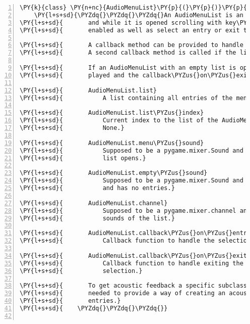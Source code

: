 \begin{Verbatim}[commandchars=\\\{\},numbers=left,firstnumber=1,stepnumber=1]
\PY{k}{class} \PY{n+nc}{AudioMenuList}\PY{p}{(}\PY{p}{)}\PY{p}{:}
    \PY{l+s+sd}{\PYZdq{}\PYZdq{}\PYZdq{}An AudioMenuList is an acoustic widget for a list menu. It can be opened}
\PY{l+s+sd}{       and while it is opened scrolling with key\PYZhy{}events through its entries is}
\PY{l+s+sd}{       enabled as well as select an entry or exit the menu by pressing a key.}

\PY{l+s+sd}{       A callback method can be provided to handle the selection of an entry.}
\PY{l+s+sd}{       A second callback method is called if the list is exited.}

\PY{l+s+sd}{       If an AudioMenuList with an empty list is opened its empty\PYZus{}sound is}
\PY{l+s+sd}{       played and the callback\PYZus{}on\PYZus{}exit method is called.}

\PY{l+s+sd}{       AudioMenuList.list}
\PY{l+s+sd}{           A list containing all entries of the menu.}

\PY{l+s+sd}{       AudioMenuList.list\PYZus{}index}
\PY{l+s+sd}{           Current index to the list of the AudioMenuList. Initially set to}
\PY{l+s+sd}{           None.}

\PY{l+s+sd}{       AudioMenuList.menu\PYZus{}sound}
\PY{l+s+sd}{           Supposed to be a pygame.mixer.Sound and is played as title when the}
\PY{l+s+sd}{           list opens.}

\PY{l+s+sd}{       AudioMenuList.empty\PYZus{}sound}
\PY{l+s+sd}{           Supposed to be a pygame.mixer.Sound and is played when the list opens}
\PY{l+s+sd}{           and has no entries.}

\PY{l+s+sd}{       AudioMenuList.channel}
\PY{l+s+sd}{           Supposed to be a pygame.mixer.channel and is used to play back all}
\PY{l+s+sd}{           sounds of the list.}

\PY{l+s+sd}{       AudioMenuList.callback\PYZus{}on\PYZus{}entry\PYZus{}selected}
\PY{l+s+sd}{           Callback function to handle the selection of an entry.}

\PY{l+s+sd}{       AudioMenuList.callback\PYZus{}on\PYZus{}exit}
\PY{l+s+sd}{           Callback function to handle exiting the list without a previous}
\PY{l+s+sd}{           selection.}

\PY{l+s+sd}{       To get acoustic feedback a specific subclass of AudioMenuList is}
\PY{l+s+sd}{       needed to provide a way of creating an acoustic version of all the list}
\PY{l+s+sd}{       entries.}
\PY{l+s+sd}{    \PYZdq{}\PYZdq{}\PYZdq{}}


\end{Verbatim}
